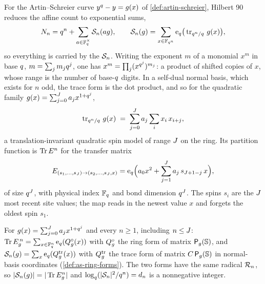 For the Artin--Schreier curve $y^{q}-y = g(x)$ of \cref{def:artin-schreier},
Hilbert 90 reduces the affine count to exponential sums,
\begin{equation}
\label{eq:as-hilbert90}
N_{n} = q^{n} + \sum_{a\in\mathbb F_q^{\times}}\mathcal S_{n}(ag),
\qquad
\mathcal S_{n}(g) = \sum_{x\in\mathbb F_{q^{n}}}\mathrm e_q\big(\operatorname{tr}_{q^n/q}\, g(x)\big),
\end{equation}
so everything is carried by the $\mathcal S_{n}$. Writing the exponent $m$ of a
monomial $x^{m}$ in base $q$, $m = \sum_j m_jq^{j}$, one has
$x^{m} = \prod_j (x^{q^{j}})^{m_j}$: a product of shifted copies of $x$,
whose range is the number of base-$q$ digits. In a self-dual normal basis,
which exists for $n$ odd, the trace form is the dot product, and so for the
quadratic family $g(x) = \sum_{j=0}^{J}a_jx^{1+q^{j}}$,
\begin{equation}
\label{eq:as-local-energy}
\operatorname{tr}_{q^n/q}\, g(x) \;=\; \sum_{j=0}^{J} a_j\sum_{i} x_i\,x_{i+j},
\end{equation}
a translation-invariant quadratic spin model of range $J$ on the ring.
Its partition function is $\operatorname{Tr}E^{n}$ for the transfer matrix
\begin{equation}
\label{eq:as-transfer-entries}
E_{(s_1,\dots,s_{J})\to(s_2,\dots,s_{J},x)}
= \mathrm e_q\Big(a_0x^{2} + \sum_{j=1}^{J} a_j\,s_{J+1-j}\,x\Big),
\end{equation}
of size $q^{J}$, with physical index $\mathbb F_q$ and bond dimension
$q^{J}$. The spins $s_i$ are the $J$ most recent site values;
the map reads in the newest value $x$ and forgets the oldest spin $s_1$.

\begin{proposition}
\label{prop:as-transfer-matrix}
For $g(x) = \sum_{j=0}^{J}a_jx^{1+q^{j}}$ and every $n\ge1$, including
$n\le J$: $\operatorname{Tr}E_g^{\,n} = \sum_{x\in\mathbb F_q^n}\mathrm e_q(Q^{\circ}_{g}(x))$ with $Q^{\circ}_{g}$
the ring form of matrix $\mathsf P_{g}(\mathbb S)$, and $\mathcal S_{n}(g) =
\sum_{x}\mathrm e_q(Q^{\mathrm{tr}}_{g}(x))$ with $Q^{\mathrm{tr}}_{g}$ the trace form of matrix
$C\,\mathsf P_{g}(\mathbb S)$ in normal-basis coordinates (\cref{def:as-ring-forms}). The two
forms have the same radical $\mathcal R_{n}$, so $|\mathcal S_{n}(g)| = |\operatorname{Tr}E_g^n|$ and
$\log_{q}(|\mathcal S_{n}|^2/q^n) = d_{n}$ is a nonnegative integer.
\end{proposition}

